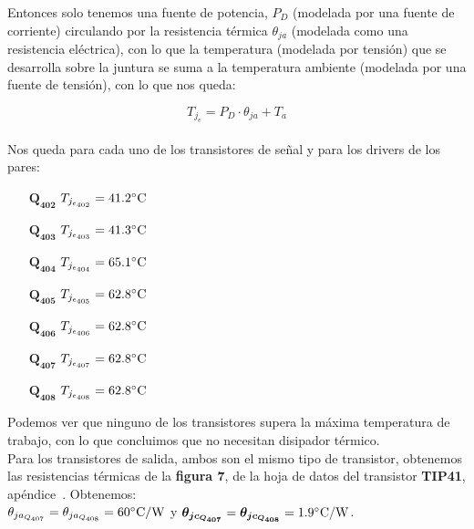 Entonces solo tenemos una fuente de potencia, $P_{D}$ (modelada por una fuente de corriente) circulando por la resistencia térmica $\theta_{ja}$ (modelada como una resistencia eléctrica), con lo que la temperatura (modelada por tensión) que se desarrolla sobre la juntura se suma a la temperatura ambiente (modelada por una fuente de tensión), con lo que nos queda:


\begin{equation} \label{eq:thermal_ambient}
T_{j_{e}} = P_{D} \cdot \theta_{ja} + T_{a}
\end{equation}\\

Nos queda para cada uno de los transistores de señal y para los drivers de los pares:

\begin{enumerate}
\item[$\bm{Q_{402}}$] $T_{j_{e_{402}}} = 41.2 \si[per-mode=symbol]{\celsius} $ 
\item[$\bm{Q_{403}}$] $T_{j_{e_{403}}} = 41.3 \si[per-mode=symbol]{\celsius} $ 
\item[$\bm{Q_{404}}$] $T_{j_{e_{404}}} = 65.1 \si[per-mode=symbol]{\celsius} $
\item[$\bm{Q_{405}}$] $T_{j_{e_{405}}} = 62.8 \si[per-mode=symbol]{\celsius} $
\item[$\bm{Q_{406}}$] $T_{j_{e_{406}}} = 62.8 \si[per-mode=symbol]{\celsius} $
\item[$\bm{Q_{407}}$] $T_{j_{e_{407}}} = 62.8 \si[per-mode=symbol]{\celsius} $
\item[$\bm{Q_{408}}$] $T_{j_{e_{408}}} = 62.8 \si[per-mode=symbol]{\celsius} $
\end{enumerate}

Podemos ver que ninguno de los transistores supera la máxima temperatura de trabajo, con lo que concluimos que no necesitan disipador térmico.\\

Para los transistores de salida, ambos son el mismo tipo de transistor, obtenemos las resistencias térmicas de la \textbf{figura 7},  de la hoja de datos del transistor \textbf{TIP41}, apéndice~. Obtenemos:\\

$\theta_{ja_{Q_{407}}} = \theta_{ja_{Q_{408}}} = 60 \si[per-mode=symbol]{\celsius\per\watt}$ y $\bm{\theta_{jc_{Q_{407}}}} = \bm{\theta_{jc_{Q_{408}}}} = 1.9 \si[per-mode=symbol]{\celsius\per\watt} $.\\

